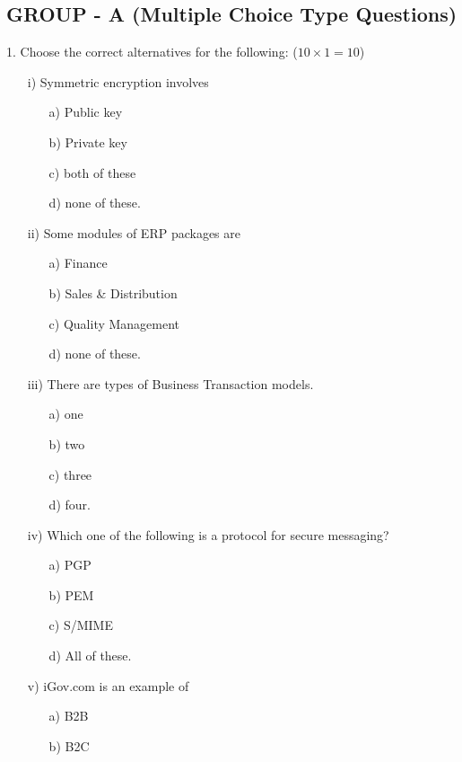\documentclass{article}
\begin{document}
\subsection*{GROUP - A (Multiple Choice Type Questions)}
1. Choose the correct alternatives for the following: ($10 \times 1 = 10$)
\begin{enumerate}
    \item[i)] Symmetric encryption involves
    \begin{enumerate}
        \item[a)] Public key
        \item[b)] Private key
        \item[c)] both of these
        \item[d)] none of these.
    \end{enumerate}
    \item[ii)] Some modules of ERP packages are
    \begin{enumerate}
        \item[a)] Finance
        \item[b)] Sales \& Distribution
        \item[c)] Quality Management
        \item[d)] none of these.
    \end{enumerate}
    \item[iii)] There are \underline{\hspace{2cm}} types of Business Transaction models.
    \begin{enumerate}
        \item[a)] one
        \item[b)] two
        \item[c)] three
        \item[d)] four.
    \end{enumerate}
    \item[iv)] Which one of the following is a protocol for secure messaging?
    \begin{enumerate}
        \item[a)] PGP
        \item[b)] PEM
        \item[c)] S/MIME
        \item[d)] All of these.
    \end{enumerate}
    \item[v)] iGov.com is an example of
    \begin{enumerate}
        \item[a)] B2B
        \item[b)] B2C

\end{enumerate}
\end{enumerate}
\end{document}
